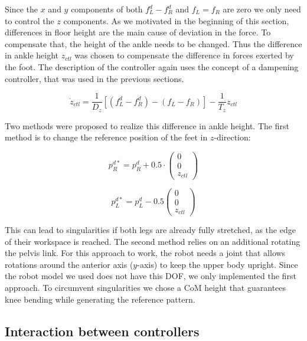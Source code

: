 \documentclass[english,ngerman]{KITreprt}
\begin{document}
Since the $x$ and $y$ components of both $f^d_L - f^d_R$ and $f_L = f_R$
are zero we only need to control the $z$ components. As we motivated in
the beginning of this section, differences in floor height are the main
cause of deviation in the force. To compensate that, the height of the
ankle needs to be changed. Thus the difference in ankle height $z_{ctl}$
was chosen to compensate the difference in forces exerted by the foot.
The description of the controller again uses the concept of a dampening
controller, that was used in the previous sections.

\begin{equation}
\dot{z}_{ctl} = \frac{1}{D_z} [(f^d_L - f^d_R) - (f_L - f_R)] - \frac{1}{T_z} z_{ctl}
\end{equation}

Two methods were proposed to realize this difference in ankle height.
The first method is to change the reference position of the feet in
$z$-direction:

\begin{equation}
p^{d*}_R = p^d_R + 0.5 \cdot \left(\begin{array}{c}0 \\ 0 \\ z_{ctl} \end{array}\right)
\end{equation}

\begin{equation}
p^{d*}_L = p^d_L - 0.5 \left(\begin{array}{c}0 \\ 0 \\ z_{ctl} \end{array}\right)
\end{equation}

This can lead to singularities if both legs are already fully stretched,
as the edge of their workspace is reached. The second method relies on
an additional rotating the pelvis link. For this approach to work, the
robot needs a joint that allows rotations around the anterior axis
($y$-axis) to keep the upper body upright. Since the robot model we used
does not have this DOF, we only implemented the first approach. To
circumvent singularities we chose a CoM height that guarantees knee
bending while generating the reference pattern.

\subsection{Interaction between
controllers}\label{interaction-between-controllers}
\end{document}
